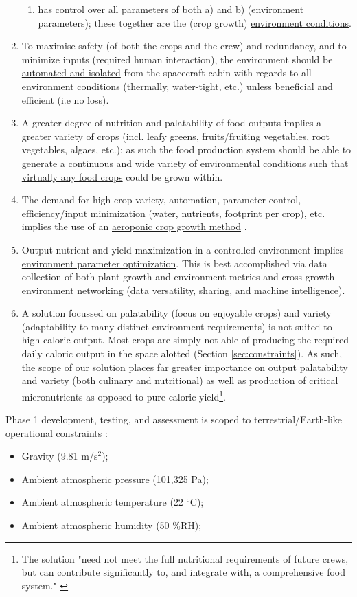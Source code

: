 \documentclass{report}
\begin{document}
\begin{enumerate}[label=SC\arabic*., ref=SC\arabic*]
\begin{enumerate}[label=SC3\alph*., ref=SC3\alph*]
        \item \label{sc:3c} has control over all \uline{parameters} of both a) and b) (environment parameters); these together are the (crop growth) \uline{environment conditions}.
    \end{enumerate}
\item \label{sc:4} To maximise safety (of both the crops and the crew) and redundancy, and to minimize inputs (required human interaction), the environment should be \uline{automated and isolated} from the spacecraft cabin with regards to all environment conditions (thermally, water-tight, etc.) unless beneficial and efficient (i.e no loss).
\newpage
\item \label{sc:5} A greater degree of nutrition and palatability of food outputs implies a greater variety of crops (incl. leafy greens, fruits/fruiting vegetables, root vegetables, algaes, etc.); as such the food production system should be able to \uline{generate a continuous and wide variety of environmental conditions} such that \uline{virtually any food crops} could be grown within.
\item \label{sc:6} The demand for high crop variety, automation, parameter control, efficiency/input minimization (water, nutrients, footprint per crop), etc. implies the use of an \uline{aeroponic crop growth method} \cite{spinoff}.
\item \label{sc:7} Output nutrient and yield maximization in a controlled-environment implies \uline{environment parameter optimization}. 
    This is best accomplished via data collection of both plant-growth and environment metrics and cross-growth-environment networking (data versatility, sharing, and machine intelligence).
\item \label{sc:8} A solution focussed on palatability (focus on enjoyable crops) and variety (adaptability to many distinct environment requirements) is not suited to high caloric output. 
    Most crops are simply not able of producing the required daily caloric output in the space alotted (Section \ref{sec:constraints}). 
    As such, the scope of our solution places \uline{far greater importance on output palatability and variety} (both culinary and nutritional) as well as production of critical micronutrients as opposed to pure caloric 
    yield\footnote{The solution "need not meet the full nutritional requirements of future crews, but can contribute significantly to, and integrate with, a comprehensive food system." \cite{applicantguide}}.
\end{enumerate}
Phase 1 development, testing, and assessment is scoped to terrestrial/Earth-like operational constraints \cite{applicantguide}:
\begin{itemize}
    \item Gravity (9.81 m/s${}^2$);
    \item Ambient atmospheric pressure (101,325 Pa);
    \item Ambient atmospheric temperature (22 °C);
    \item Ambient atmospheric humidity (50 \%RH);
\end{itemize}
\end{document}

